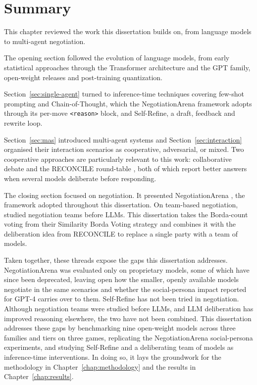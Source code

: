 \section{Summary}\label{sec:litreview-summary}

This chapter reviewed the work this dissertation builds on, from language models to multi-agent negotiation.

The opening section followed the evolution of language models, from early statistical approaches through the Transformer architecture and the GPT family, open-weight releases and post-training quantization.

Section~\ref{sec:single-agent} turned to inference-time techniques covering few-shot prompting and Chain-of-Thought, which the NegotiationArena framework adopts through its per-move \texttt{<reason>} block, and Self-Refine, a draft, feedback and rewrite loop. 

Section~\ref{sec:mas} introduced multi-agent systems and Section~\ref{sec:interaction} organised their interaction scenarios as cooperative, adversarial, or mixed. Two cooperative approaches are particularly relevant to this work: collaborative debate \parencite{3692070.3692537} and the RECONCILE round-table \parencite{chen2024reconcileroundtableconferenceimproves}, both of which report better answers when several models deliberate before responding.

The closing section focused on negotiation. It presented NegotiationArena \parencite{bianchi_how_2024}, the framework adopted throughout this dissertation. On team-based negotiation, \textcite{S_nchez_Anguix_2013} studied negotiation teams before \acp{LLM}. This dissertation takes the Borda-count voting from their Similarity Borda Voting strategy and combines it with the deliberation idea from RECONCILE \parencite{chen2024reconcileroundtableconferenceimproves} to replace a single party with a team of models.

Taken together, these threads expose the gaps this dissertation addresses. NegotiationArena was evaluated only on proprietary models, some of which have since been deprecated, leaving open how the smaller, openly available models negotiate in the same scenarios and whether the social-persona impact reported for GPT-4 carries over to them. Self-Refine has not been tried in negotiation. Although negotiation teams were studied before \acp{LLM}, and \ac{LLM} deliberation has improved reasoning elsewhere, the two have not been combined. This dissertation addresses these gaps by benchmarking nine open-weight models across three families and tiers on three games, replicating the NegotiationArena social-persona experiments, and studying Self-Refine and a deliberating team of models as inference-time interventions. In doing so, it lays the groundwork for the methodology in Chapter~\ref{chap:methodology} and the results in Chapter~\ref{chap:results}.